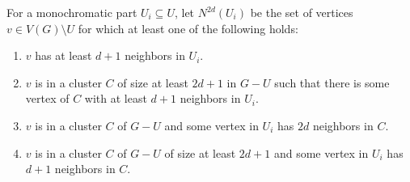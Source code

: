 \begin{definition}
    \label{def:n2d}
    For a monochromatic part $U_i \subseteq U$, let $N^{2d}(U_i)$ be the set of vertices $v \in V(G) \setminus U$ for which at least one of the following holds:

    \begin{enumerate}
        \item $v$ has at least $d+1$ neighbors in $U_i$.
        \item $v$ is in a cluster $C$ of size at least $2d+1$ in $G - U$ such that there is some vertex of $C$ with at least $d+1$ neighbors in $U_i$.
        \item $v$ is in a cluster $C$ of $G - U$ and some vertex in $U_i$ has $2d$ neighbors in $C$.
        \item $v$ is in a cluster $C$ of $G - U$ of size at least $2d+1$ and some vertex in $U_i$ has $d+1$ neighbors in $C$.
    \end{enumerate}
\end{definition}

